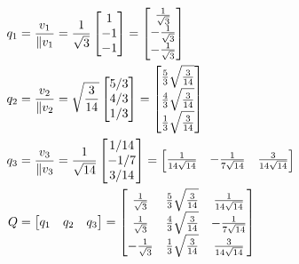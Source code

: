 \begin{align*}
    q_1 & =\frac{v_1}{\Vert{v_1}}=\frac{1}{\sqrt{3}}\begin{bmatrix}
        1 \\-1\\-1
    \end{bmatrix}=\begin{bmatrix}
        \frac{1}{\sqrt{3}} \\-\frac{1}{\sqrt{3}}\\-\frac{1}{\sqrt{3}}
    \end{bmatrix}  \\
    q_2 & =\frac{v_2}{\Vert{v_2}}=\sqrt{\frac{3}{14}}\begin{bmatrix}
        5/3 \\4/3\\1/3
    \end{bmatrix}=\begin{bmatrix}
        \frac{5}{3} \sqrt{\frac{3}{14}} \\\frac{4}{3} \sqrt{\frac{3}{14}}\\\frac{1}{3} \sqrt{\frac{3}{14}}
    \end{bmatrix} \\
    q_3 & =\frac{v_3}{\Vert{v_3}}=\frac{1}{\sqrt{14}}\begin{bmatrix}
        1/14 \\-1/7\\3/14
    \end{bmatrix}=\begin{bmatrix}
        \frac{1}{14\sqrt{14}} & -\frac{1}{7\sqrt{14}} & \frac{3}{14\sqrt{14}}
    \end{bmatrix} \\
    Q   & =\begin{bmatrix}
        q_1 & q_2 & q_3
    \end{bmatrix}
    =\begin{bmatrix}
        \frac{1}{\sqrt{3}}   & \frac{5}{3}\sqrt{\frac{3}{14}}  & \frac{1}{14\sqrt{14}} \\
        \-\frac{1}{\sqrt{3}} & \frac{4}{3} \sqrt{\frac{3}{14}} & -\frac{1}{7\sqrt{14}} \\
        -\frac{1}{\sqrt{3}}  & \frac{1}{3} \sqrt{\frac{3}{14}} & \frac{3}{14\sqrt{14}}
    \end{bmatrix}
\end{align*}

